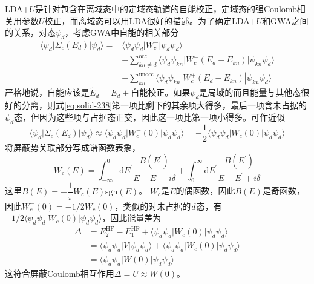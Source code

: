 LDA+$U$是针对包含在离域态中的定域态轨道的自能校正，定域态的强Coulomb相关用参数$U$校正，而离域态可以用LDA很好的描述。为了确定LDA+$U$和GWA之间的关系，对态$\psi_d$，考虑GWA中自能的相关部分
\begin{equation}
  \begin{split}
    \langle\psi_d|\Sigma_c(E_d)|\psi_d\rangle=&\langle\psi_d\psi_d|W_c^-|\psi_d\psi_d\rangle\\
    &+\sum_{kn\neq d}^{\mathrm{occ}}\langle\psi_d\psi_{kn}|W_c^-(E_d-E_{kn})|\psi_{kn}\psi_d\rangle\\
    &+\sum_{kn}^{\mathrm{unocc}}\langle\psi_d\psi_{kn}|W_c^+(E_d-E_{kn})|\psi_{kn}\psi_d\rangle
  \end{split}
  \label{eq:solid-238}
\end{equation}
严格地说，自能应该是$\tilde E_d=E_d+$自能校正。如果$\psi_d$是局域的而且能量与其他态很好的分离，则式\eqref{eq:solid-238}第一项比剩下的其余项大得多，最后一项含未占据的$\psi_d$态，但因为这些项与占据态正交，因此这一项比第一项小得多。可作近似\cite{JPCM9-767_1997}
\begin{equation}
  \langle\psi_d|\Sigma_c(E_d)|\psi_d\rangle\approx\langle\psi_d\psi_d|W_c^-(0)|\psi_d\psi_d\rangle=-\frac12\langle\psi_d\psi_d|W_c(0)|\psi_d\psi_d\rangle
  \label{eq:solid-239}
\end{equation}
将屏蔽势关联部分写成谱函数表象，
\begin{equation}
	W_c(E)=\int_{-\infty}^0\mathrm{d}E^{\prime}\frac{B(E^{\prime})}{E-E^{\prime}-i\delta}+\int_0^{\infty}\mathrm{d}E^{\prime}\frac{B(E^{\prime})}{E-E^{\prime}+i\delta}
  \label{eq:solid-240}
\end{equation}
这里$B(E)=-\dfrac1{\pi}W_c(E)\mathrm{sgn}(E)$。
$W_c$是$E$的偶函数，因此$B(E)$是奇函数，因此$W_c^-(0)=-1/2W_c(0)$，类似的对未占据的{\textit d}\,态，有$+1/2\langle\psi_d\psi_d|W_c(0)|\psi_d\psi_d\rangle$，因此能量差为
\begin{equation}
  \begin{split}
	  \Delta&=E_2^{\mathrm{HF}}-E_1^{\mathrm{HF}}+\langle\psi_d\psi_d|W_c(0)|\psi_d\psi_d\rangle\\
    &=\langle\psi_d\psi_d|V|\psi_d\psi_d\rangle+\langle\psi_d\psi_d|W_c(0)|\psi_d\psi_d\rangle\\
    &=\langle\psi_d\psi_d|W(0)|\psi_d\psi_d\rangle
  \end{split}
  \label{eq:solid-241}
\end{equation}
这符合屏蔽Coulomb相互作用$\Delta=U\approx W(0)$。

